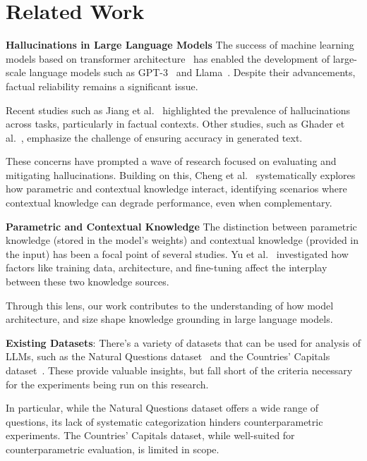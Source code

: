 \section{Related Work}
\label{related_work}

\textbf{Hallucinations in Large Language Models}
The success of machine learning models based on transformer architecture~\cite{attention_is_all_you_need} has enabled the development of large-scale language models such as GPT-3~\cite{gpt3} and Llama~\cite{llama}.
Despite their advancements, factual reliability remains a significant issue.

Recent studies such as Jiang et al.~\cite{how_can_we_know} highlighted the prevalence of hallucinations across tasks, particularly in factual contexts.
Other studies, such as Ghader et al.~\cite{can_rag_models_reason}, emphasize the challenge of ensuring accuracy in generated text.

These concerns have prompted a wave of research focused on evaluating and mitigating hallucinations.
Building on this, Cheng et al.~\cite{understanding_the_interplay} systematically explores how parametric and contextual knowledge interact, identifying scenarios where contextual knowledge can degrade performance, even when complementary.


\textbf{Parametric and Contextual Knowledge} 
The distinction between parametric knowledge (stored in the model's weights) and contextual knowledge (provided in the input) has been a focal point of several studies.
Yu et al.~\cite{factual_recall} investigated how factors like training data, architecture, and fine-tuning affect the interplay between these two knowledge sources.

Through this lens, our work contributes to the understanding of how model architecture, and size shape knowledge grounding in large language models.

\textbf{Existing Datasets}: There's a variety of datasets that can be used for analysis of LLMs, such as the Natural Questions dataset~\cite{natural_questions} and the Countries' Capitals dataset~\cite{factual_recall}.
These provide valuable insights, but fall short of the criteria necessary for the experiments being run on this research.

In particular, while the Natural Questions dataset offers a wide range of questions, its lack of systematic categorization hinders counterparametric experiments.
The Countries' Capitals dataset, while well-suited for counterparametric evaluation, is limited in scope.

